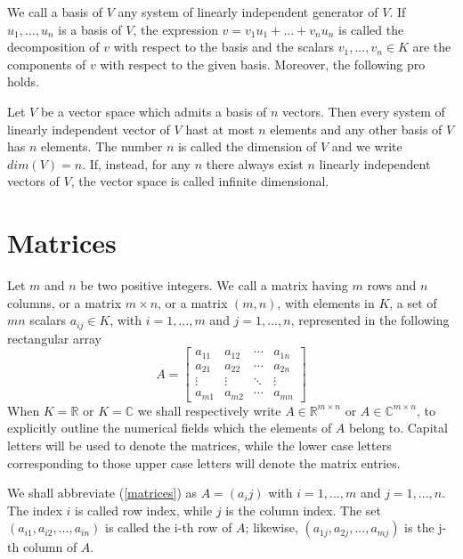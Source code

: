 We call a basis of $V$ any system of linearly independent generator of $V$. If ${u_1, ..., u_n}$ is a basis of $V$, the expression $v = v_1 u_1 + ... + v_n u_n$ is called the decomposition of $v$ with respect to the basis and the scalars $v_1, ..., v_n \in K$ are the components of $v$ with respect to the given basis. Moreover, the following pro holds.

\begin{property}
    Let $V$ be a vector space which admits a basis of $n$ vectors. Then every system of linearly independent vector of $V$ hast at most $n$ elements and any other basis of $V$ has $n$ elements. The number $n$ is called the dimension of $V$ and we write $dim(V) = n$.
    If, instead, for any $n$ there always exist $n$ linearly independent vectors of $V$, the vector space is called infinite dimensional.
\end{property}

\section{Matrices}
Let $m$ and $n$ be two positive integers. We call a matrix having $m$ rows and $n$ columns, or a matrix $m \times n$, or a matrix $(m, n)$, with elements in $K$, a set of $mn$ scalars $a_{ij} \in K$, with $i = 1,...,m$ and $j = 1,...,n$, represented in the following rectangular array
\begin{equation}
    A = \begin{bmatrix}
        a_{11} & a_{12} & \cdots & a_{1n} \\
        a_{21} & a_{22} & \cdots & a_{2n} \\
        \vdots & \vdots & \ddots & \vdots \\
        a_{m1} & a_{m2} & \cdots & a_{mn}
        \end{bmatrix}
    \label{matrices}
\end{equation}
When $K = \mathbb{R}$ or $K = \mathbb{C}$ we shall respectively write $A \in \mathbb{R}^{m \times n}$ or $A \in \mathbb{C}^{m \times n}$, to explicitly outline the numerical fields which the elements of $A$ belong to. Capital letters will be used to denote the matrices, while the lower case letters corresponding to those upper case letters will denote the matrix entries.

We shall abbreviate (\ref{matrices}) as $A = (a_ij)$ with $i = 1,...,m$ and $j = 1,...,n$. The index $i$ is called row index, while $j$ is the column index. The set $(a_{i1}, a_{i2}, ..., a_{in})$ is called the i-th row of $A$; likewise, $(a_{1j}, a_{2j}, ..., a_{mj})$ is the j-th column of $A$.


